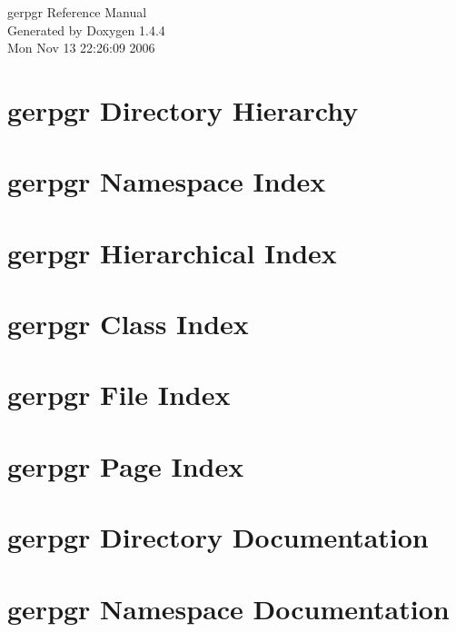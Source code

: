 \documentclass[a4paper]{book}
\begin{document}
\begin{titlepage}
\vspace*{7cm}
\begin{center}
{\Large gerpgr Reference Manual}\\
\vspace*{1cm}
{\large Generated by Doxygen 1.4.4}\\
\vspace*{0.5cm}
{\small Mon Nov 13 22:26:09 2006}\\
\end{center}
\end{titlepage}
\clearemptydoublepage
{}
\tableofcontents
\clearemptydoublepage
{}
\chapter{gerpgr Directory Hierarchy}

\chapter{gerpgr Namespace Index}

\chapter{gerpgr Hierarchical Index}

\chapter{gerpgr Class Index}

\chapter{gerpgr File Index}

\chapter{gerpgr Page Index}

\chapter{gerpgr Directory Documentation}






\chapter{gerpgr Namespace Documentation}


\end{document}
